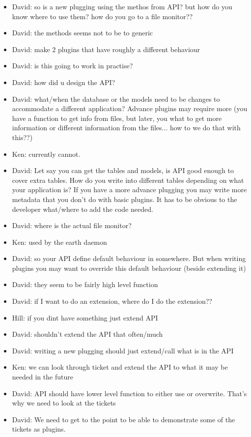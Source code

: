 \documentclass{letter}
\begin{document}
\begin{itemize}
 \item David: so is a new plugging using the methos from API? but how do you know where to use them? how do you go to a file monitor??
 \item David: the methods seems not to be to generic
 \item David: make 2 plugins that have roughly a different behaviour
 \item David: is this going to work in practise?
 \item David: how did u design the API?
 \item David: what/when the database or the models need to be changes to accommodate a different application?  Advance plugins may require more (you have a function to get info from files, but later, you what to get more information or different information from the files... how  to we do that with this??)
 \item Ken: currently cannot.
 \item David: Let say you can get the tables and models, is API good enough to cover extra tables. How do you write into different tables depending on what your application is? If  you have a more advance plugging you may write more metadata that you don't do with basic plugins.  It has to be obvious to the developer what/where to add the code needed.
 \item David: where is the actual file monitor?
 \item Ken: used by the earth daemon
 \item David: so your API define default behaviour in somewhere.  But when writing plugins you may want to override this default behaviour (beside extending it)
 \item David: they seem to be fairly high level function
 \item David: if I want to do an extension, where do I do the extension??
 \item Hill: if you dint have something just extend API
 \item David: shouldn't extend the API that often/much
 \item David: writing a new plugging should just extend/call what is in the API
 \item Ken: we can look through ticket and extend the API to what it may be needed in the future
 \item David: API should have lower level function to either use or overwrite. That's why we need to look at the tickets
 \item David: We need to get to the point to be able to demonstrate some of the tickets as plugins.  

\end{itemize}
\end{document}
